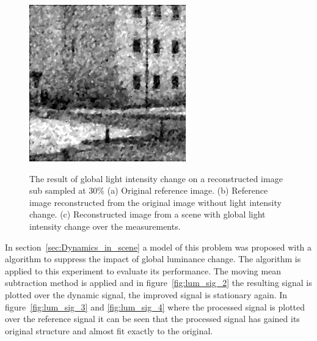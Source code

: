 \begin{figure}[H]
\begin{minipage}[t]{0.32\textwidth}
    \subcaption{}
    \label{fig:lum_2}
\end{minipage}
\begin{minipage}[t]{0.32\textwidth}
    \includegraphics[width = \textwidth]{result/dynamic/lum/intense_change_psnr_19_snr_14_sssim_38.png}
    \subcaption{}
    \label{fig:lum_3}
\end{minipage}
    \caption{The result of global light intensity change on a reconstructed image sub sampled at 30\% (a) Original reference image. (b) Reference image reconstructed from the original image without light intensity change. (c) Reconstructed image from a scene with global light intensity change over the measurements.}
    \label{fig:lum_dyn}
\end{figure}

In section~\ref{sec:Dynamics_in_scene} a model of this problem was proposed with a algorithm to suppress the impact of global luminance change. The algorithm is applied to this experiment to evaluate its performance. The moving mean subtraction method is applied and in figure~\ref{fig:lum_sig_2} the resulting signal is plotted over the dynamic signal, the improved signal is stationary again. In figure~\ref{fig:lum_sig_3} and \ref{fig:lum_sig_4} where the processed signal is plotted over the reference signal it can be seen that the processed signal has gained its original structure and almost fit exactly to the original.


